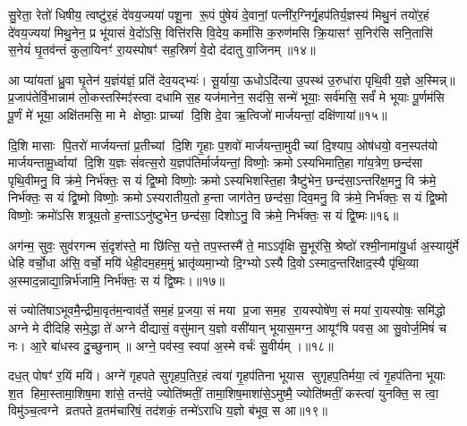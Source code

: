 सु॒रेता॒ रेतो॑ धिषीय॒ त्वष्टु॑र॒हं दे॑वय॒ज्यया॑ पशू॒ना रू॒पं पु॑षेयं दे॒वानां॒ पत्नी॑र॒ग्निर्गृ॒हप॑तिर्य॒ज्ञस्य॑ मिथु॒नं तयो॑र॒हं दे॑वय॒ज्यया॑ मिथु॒नेन॒ प्र भू॑यासं वे॒दो॑ऽसि॒ वित्ति॑रसि वि॒देय॒ कर्मा॑सि क॒रुण॑मसि क्रि॒यासꣳ॑ स॒निर॑सि सनि॒तासि॑ स॒नेयं॑ घृ॒तव॑न्तं कुला॒यिनꣳ॑ रा॒यस्पोषꣳ॑ सह॒स्रिणं॑ वे॒दो द॑दातु वा॒जिनम्॥१४॥

{\anuvakamend[{इन्द्र॑स्या॒हमिन्द्र॑वन्तः॒ सोम॑स्या॒हं दे॑वय॒ज्यया॒ चतु॑श्चत्वारिशच्च॥४॥}]}

आ प्या॑यतां ध्रु॒वा घृ॒तेन॑ य॒ज्ञंय॑ज्ञं॒ प्रति॑ देव॒यद्भ्यः॑। सू॒र्याया॒ ऊधोऽदि॑त्या उ॒पस्थ॑ उ॒रुधा॑रा पृथि॒वी य॒ज्ञे अ॒स्मिन्न्॥ प्र॒जाप॑तेर्वि॒भान्नाम॑ लो॒कस्तस्मिꣵ॑स्त्वा दधामि स॒ह यज॑मानेन॒ सद॑सि॒ सन्मे॑ भूयाः॒ सर्व॑मसि॒ सर्वं॑ मे भूयाः पू॒र्णम॑सि पू॒र्णं मे॑ भूया॒ अक्षि॑तमसि॒ मा मे क्षेष्ठाः॒ प्राच्यां दि॒शि दे॒वा ऋ॒त्विजो॑ मार्जयन्तां॒ दक्षि॑णायां॥१५॥

दि॒शि मासाः पि॒तरो॑ मार्जयन्तां प्र॒तीच्यां दि॒शि गृ॒हाः प॒शवो॑ मार्जयन्ता॒मुदीच्यां दि॒श्याप॒ ओष॑धयो॒ वन॒स्पत॑यो मार्जयन्तामू॒र्ध्वायां दि॒शि य॒ज्ञः सं॑वत्स॒रो य॒ज्ञप॑तिर्मार्जयन्तां॒ विष्णोः॒ क्रमोऽस्यभिमाति॒हा गा॑य॒त्रेण॒ छन्द॑सा पृथि॒वीमनु॒ वि क्र॑मे॒ निर्भ॑क्तः॒ स यं द्वि॒ष्मो विष्णोः॒ क्रमोऽस्यभिशस्ति॒हा त्रैष्टु॑भेन॒ छन्द॑सा॒ऽन्तरि॑क्ष॒मनु॒ वि क्र॑मे॒ निर्भ॑क्तः॒ स यं द्वि॒ष्मो विष्णोः॒ क्रमोऽस्यरातीय॒तो ह॒न्ता जाग॑तेन॒ छन्द॑सा॒ दिव॒मनु॒ वि क्र॑मे॒ निर्भ॑क्तः॒ स यं द्वि॒ष्मो विष्णोः॒ क्रमो॑ऽसि शत्रूय॒तो ह॒न्ताऽऽनु॑ष्टुभेन॒ छन्द॑सा॒ दिशोऽनु॒ वि क्र॑मे॒ निर्भ॑क्तः॒ स यं द्वि॒ष्मः॥१६॥

{\anuvakamend[{दक्षि॑णायां द्वि॒ष्मो विष्णो॒रेका॒न्नत्रि॒ꣳ॒शच्च॑॥५॥}]}

अग॑न्म॒ सुवः॒ सुव॑रगन्म सं॒दृश॑स्ते॒ मा छि॑त्सि॒ यत्ते॒ तप॒स्तस्मै॑ ते॒ माऽऽवृ॑क्षि सु॒भूर॑सि॒ श्रेष्ठो॑ रश्मी॒नामा॑यु॒र्धा अ॒स्यायु॑र्मे धेहि वर्चो॒धा अ॑सि॒ वर्चो॒ मयि॑ धेही॒दम॒हम॒मुं भ्रातृ॑व्यमा॒भ्यो दि॒ग्भ्योऽस्यै दि॒वोऽस्माद॒न्तरि॑क्षाद॒स्यै पृ॑थि॒व्या अ॒स्माद॒न्नाद्या॒न्निर्भ॑जामि॒ निर्भ॑क्तः॒ स यं द्वि॒ष्मः।॥१७॥

सं ज्योति॑षाऽभूवमै॒न्द्रीमा॒वृत॑म॒न्वाव॑र्ते॒ सम॒हं प्र॒जया॒ सं मया प्र॒जा सम॒ह रा॒यस्पोषे॑ण॒ सं मया॑ रा॒यस्पोषः॒ समि॑द्धो अग्ने मे दीदिहि समे॒द्धा ते॑ अग्ने दीद्यासं॒ वसु॑मान् य॒ज्ञो वसी॑यान् भूयास॒मग्न॒ आयूꣳ॑षि पवस॒ आ सु॒वोर्ज॒मिषं॑ च नः। आ॒रे बा॑धस्व दु॒च्छुनाम्॥ अग्ने॒ पव॑स्व॒ स्वपा॑ अ॒स्मे वर्चः॑ सु॒वीर्यम्।॥१८॥

दध॒त् पोषꣳ॑ र॒यिं मयि॑। अग्ने॑ गृहपते सुगृहप॒तिर॒हं त्वया॑ गृ॒हप॑तिना भूयास सुगृहप॒तिर्मया॒ त्वं गृ॒हप॑तिना भूयाः श॒त हिमा॒स्तामा॒शिष॒मा शा॑से॒ तन्त॑वे॒ ज्योति॑ष्मतीं॒ तामा॒शिष॒माशा॑से॒ऽमुष्मै॒ ज्योति॑ष्मतीं॒ कस्त्वा॑ युनक्ति॒ स त्वा॒ विमु॑ञ्च॒त्वग्ने व्रतपते व्र॒तम॑चारिषं॒ तद॑शकं॒ तन्मे॑ऽराधि य॒ज्ञो ब॑भूव॒ स आ॥१९॥

